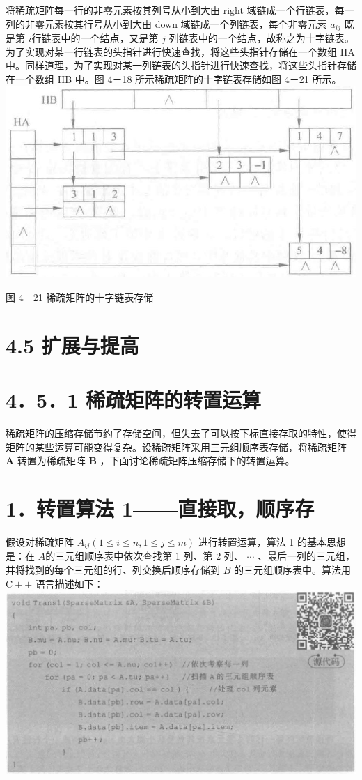 \documentclass[10pt]{article}
\begin{document}
将稀疏矩阵每一行的非零元素按其列号从小到大由 right 域链成一个行链表，每一列的非零元素按其行号从小到大由 down 域链成一个列链表，每个非零元素 $a_{i j}$ 既是第 $i$行链表中的一个结点，又是第 $j$ 列链表中的一个结点，故称之为十字链表。为了实现对某一行链表的头指针进行快速查找，将这些头指针存储在一个数组 HA 中。同样道理，为了实现对某一列链表的头指针进行快速查找，将这些头指针存储在一个数组 HB 中。图 4－18 所示稀疏矩阵的十字链表存储如图 4－21 所示。\\
\includegraphics[max width=\textwidth, center]{2025_06_06_704745ea57b15b2333e5g-126}

图 4－21 稀疏矩阵的十字链表存储

\section*{4.5 扩展与提高}
\section*{4．5．1 稀疏矩阵的转置运算}
稀疏矩阵的压缩存储节约了存储空间，但失去了可以按下标直接存取的特性，使得矩阵的某些运算可能变得复杂。设稀疏矩阵采用三元组顺序表存储，将稀疏矩阵 $\boldsymbol{A}$ 转置为稀疏矩阵 $\boldsymbol{B}$ ，下面讨论稀疏矩阵压缩存储下的转置运算。

\section*{1．转置算法 1——直接取，顺序存}
假设对稀疏矩阵 $A_{i j}(1 \leqslant i \leqslant n, 1 \leqslant j \leqslant m)$ 进行转置运算，算法 1 的基本思想是：在 $A$的三元组顺序表中依次查找第 1 列、第 2 列、 $\cdots$ 、最后一列的三元组，并将找到的每个三元组的行、列交换后顺序存储到 $B$ 的三元组顺序表中。算法用 $\mathrm{C}++$ 语言描述如下：\\
\includegraphics[max width=\textwidth, center]{2025_06_06_704745ea57b15b2333e5g-127}
\end{document}
